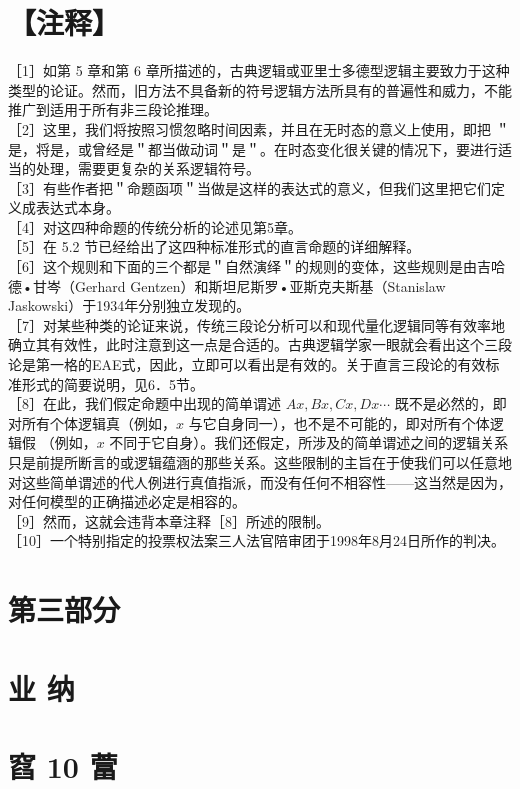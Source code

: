 \section*{【注释】}
［1］如第 5 章和第 6 章所描述的，古典逻辑或亚里士多德型逻辑主要致力于这种类型的论证。然而，旧方法不具备新的符号逻辑方法所具有的普遍性和威力，不能推广到适用于所有非三段论推理。\\
［2］这里，我们将按照习惯忽略时间因素，并且在无时态的意义上使用，即把 ＂是，将是，或曾经是＂都当做动词＂是＂。在时态变化很关键的情况下，要进行适当的处理，需要更复杂的关系逻辑符号。\\
［3］有些作者把＂命题函项＂当做是这样的表达式的意义，但我们这里把它们定义成表达式本身。\\
［4］对这四种命题的传统分析的论述见第5章。\\
［5］在 5.2 节已经给出了这四种标准形式的直言命题的详细解释。\\
［6］这个规则和下面的三个都是＂自然演绎＂的规则的变体，这些规则是由吉哈德•甘岑（Gerhard Gentzen）和斯坦尼斯罗•亚斯克夫斯基（Stanislaw Jaskowski）于1934年分别独立发现的。\\
［7］对某些种类的论证来说，传统三段论分析可以和现代量化逻辑同等有效率地确立其有效性，此时注意到这一点是合适的。古典逻辑学家一眼就会看出这个三段论是第一格的EAE式，因此，立即可以看出是有效的。关于直言三段论的有效标准形式的简要说明，见6．5节。\\
［8］在此，我们假定命题中出现的简单谓述 $A x, B x, C x, D x \cdots$ 既不是必然的，即对所有个体逻辑真（例如，$x$ 与它自身同一），也不是不可能的，即对所有个体逻辑假 （例如，$x$ 不同于它自身）。我们还假定，所涉及的简单谓述之间的逻辑关系只是前提所断言的或逻辑蕴涵的那些关系。这些限制的主旨在于使我们可以任意地对这些简单谓述的代人例进行真值指派，而没有任何不相容性——这当然是因为，对任何模型的正确描述必定是相容的。\\
［9］然而，这就会违背本章注释［8］所述的限制。\\
［10］一个特别指定的投票权法案三人法官陪审团于1998年8月24日所作的判决。

\section*{第三部分}
\section*{业 纳}
\section*{窞 10 䔰}
